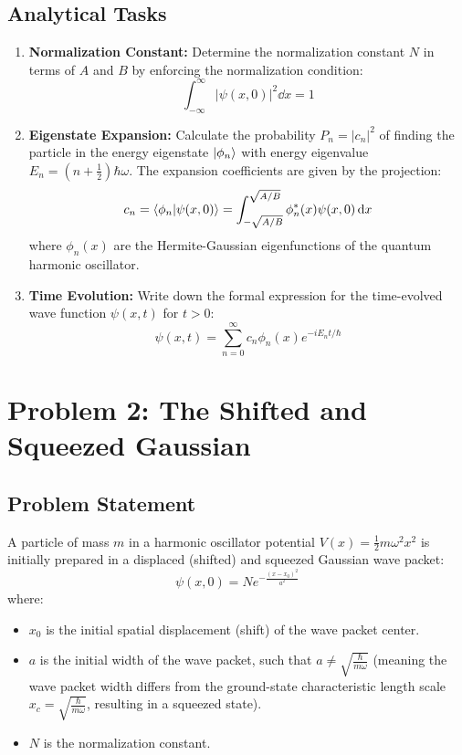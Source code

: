 \documentclass[11pt,a4paper]{article}
\begin{document}
\subsection*{Analytical Tasks}
\begin{enumerate}[label=\textbf{\arabic*.}]
    \item \textbf{Normalization Constant:} Determine the normalization constant $N$ in terms of $A$ and $B$ by enforcing the normalization condition:
    \begin{equation}
        \int_{-\infty}^{\infty} |\psi(x,0)|^2 \dd{x} = 1
    \end{equation}
    
    \item \textbf{Eigenstate Expansion:} Calculate the probability $P_n = |c_n|^2$ of finding the particle in the energy eigenstate $\ket{\phi_n}$ with energy eigenvalue $E_n = \left(n + \frac{1}{2}\right)\hbar\omega$. The expansion coefficients are given by the projection:
    \begin{equation}
        c_n = \braket{\phi_n}{\psi(x,0)} = \int_{-\sqrt{A/B}}^{\sqrt{A/B}} \phi_n^*(x) \psi(x,0) \dd{x}
    \end{equation}
    where $\phi_n(x)$ are the Hermite-Gaussian eigenfunctions of the quantum harmonic oscillator.

    \item \textbf{Time Evolution:} Write down the formal expression for the time-evolved wave function $\psi(x,t)$ for $t > 0$:
    \begin{equation}
        \psi(x,t) = \sum_{n=0}^{\infty} c_n \phi_n(x) e^{-i E_n t / \hbar}
    \end{equation}
\end{enumerate}

\newpage

\section{Problem 2: The Shifted and Squeezed Gaussian}
\label{sec:problem2}

\subsection*{Problem Statement}
A particle of mass $m$ in a harmonic oscillator potential $V(x) = \frac{1}{2}m\omega^2x^2$ is initially prepared in a displaced (shifted) and squeezed Gaussian wave packet:
\begin{equation}
    \psi(x,0) = N e^{-\frac{(x-x_0)^2}{a^2}}
\end{equation}
where:
\begin{itemize}
    \item $x_0$ is the initial spatial displacement (shift) of the wave packet center.
    \item $a$ is the initial width of the wave packet, such that $a \neq \sqrt{\frac{\hbar}{m\omega}}$ (meaning the wave packet width differs from the ground-state characteristic length scale $x_c = \sqrt{\frac{\hbar}{m\omega}}$, resulting in a squeezed state).
    \item $N$ is the normalization constant.
\end{itemize}
\end{document}
